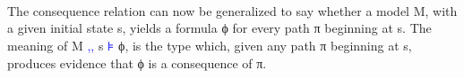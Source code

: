 \documentclass[a4paper, 11pt]{article}
\newcommand{\blue}[1]{\textcolor{blue}{#1}}
\begin{document}
\begin{code}
\AgdaSpace{}%
\AgdaSpace{}%
\AgdaSpace{}%
\AgdaSpace{}%
\AgdaSpace{}%
\<%
\\
%
\>[4]\AgdaSpace{}%
\AgdaSpace{}%
\AgdaSymbol{(}\AgdaSpace{}%
\AgdaSpace{}%
\AgdaSymbol{)}\AgdaSpace{}%
\AgdaSymbol{=}\AgdaSpace{}%
\AgdaSpace{}%
\AgdaSpace{}%
\AgdaSpace{}%
\AgdaSpace{}%
\AgdaSpace{}%
\AgdaSpace{}%
\AgdaSpace{}%
\<%
\end{code}


\begin{code}[hide]%
\>[0]\AgdaSpace{}%
\AgdaSpace{}%
\AgdaSymbol{(}\AgdaSpace{}%
\AgdaSymbol{:}\AgdaSpace{}%
\AgdaSymbol{)}%
\>[27]\<%
\\
%
\\[\AgdaEmptyExtraSkip]%
\>[0][@{}l@{\AgdaIndent{0}}]%
\>[2]\AgdaSpace{}%
\AgdaSpace{}%
\AgdaSpace{}%
\<%
\end{code}

The consequence relation can now be generalized to say whether a model M, with a
given initial state s, yields a formula ϕ for every path π beginning at s. The
meaning of M \blue{,,} s \blue{⊧} ϕ, is the type which, given any path π
beginning at s, produces evidence that ϕ is a consequence of π.
\end{document}
